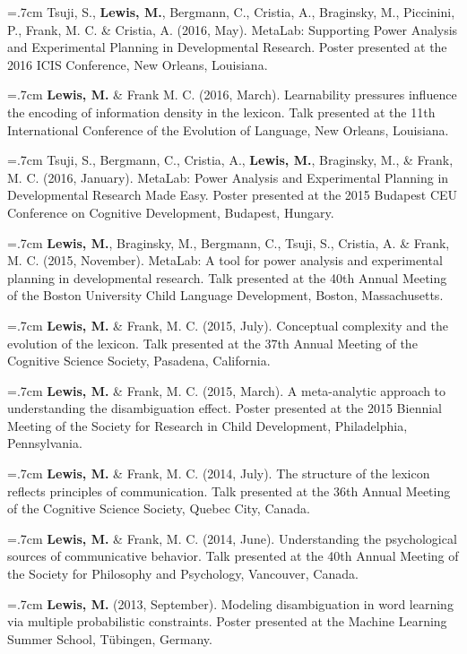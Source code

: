 \documentclass[letterpaper]{article}
\begin{document}
 \hangindent=.7cm  Tsuji, S., {\bf Lewis, M.}, Bergmann, C., Cristia, A.,  Braginsky, M.,  Piccinini, P., Frank, M. C. \& Cristia, A. (2016, May). MetaLab: Supporting Power Analysis and Experimental Planning in Developmental Research. Poster presented at the 2016 ICIS Conference, New Orleans, Louisiana.


  \hangindent=.7cm {\bf Lewis, M.} \& Frank M. C. (2016, March). Learnability pressures influence the encoding of information density in the lexicon. Talk presented at the 11th International Conference of the Evolution of Language, New Orleans, Louisiana.

  \hangindent=.7cm  Tsuji, S., Bergmann, C., Cristia, A., {\bf Lewis, M.}, Braginsky, M., \& Frank, M. C. (2016, January). MetaLab: Power Analysis and Experimental Planning in Developmental Research Made Easy. Poster presented at the 2015 Budapest CEU Conference on Cognitive Development, Budapest, Hungary.


\hangindent=.7cm {\bf Lewis, M.},  Braginsky,  M.,  Bergmann, C., Tsuji, S., Cristia, A. \& Frank, M. C. (2015, November). MetaLab: A tool for power analysis and experimental planning in developmental research. Talk presented at the 40th Annual Meeting of the Boston University Child Language Development, Boston, Massachusetts.

\hangindent=.7cm {\bf Lewis, M.} \& Frank, M. C. (2015, July). Conceptual complexity and the evolution of the lexicon. Talk presented at the 37th Annual Meeting of the Cognitive Science Society, Pasadena, California.

\hangindent=.7cm {\bf Lewis, M.} \& Frank, M. C. (2015, March). A meta-analytic approach to understanding the disambiguation effect. Poster presented at  the 2015 Biennial Meeting of the Society for Research in Child Development, Philadelphia, Pennsylvania.


\hangindent=.7cm {\bf Lewis, M.} \& Frank, M. C. (2014, July). The structure of the lexicon reflects  principles of communication. Talk presented at the 36th Annual Meeting of the Cognitive Science Society, Quebec City, Canada.

\hangindent=.7cm {\bf Lewis, M.} \& Frank, M. C. (2014, June). Understanding the psychological sources of communicative behavior. Talk presented at the 40th Annual Meeting of the Society for Philosophy and Psychology, Vancouver, Canada.

 \hangindent=.7cm {\bf Lewis, M.} (2013, September). Modeling disambiguation in word learning via multiple probabilistic constraints. Poster presented at the Machine Learning Summer School, T\"{u}bingen, Germany.
\end{document}
